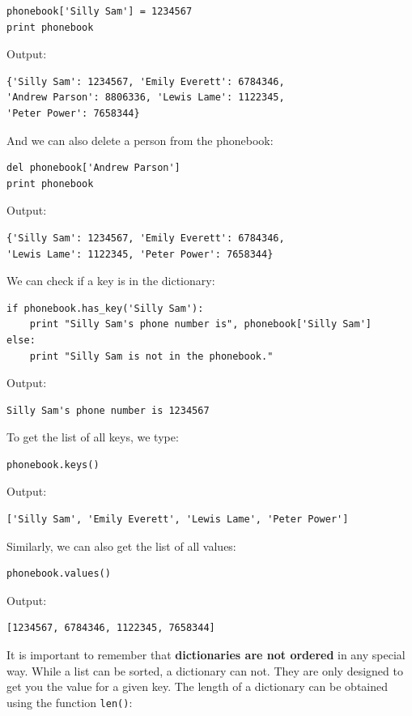 \begin{verbatim}
phonebook['Silly Sam'] = 1234567
print phonebook
\end{verbatim}
Output:

\begin{verbatim}
{'Silly Sam': 1234567, 'Emily Everett': 6784346, 
'Andrew Parson': 8806336, 'Lewis Lame': 1122345, 
'Peter Power': 7658344}
\end{verbatim}
And we can also delete a person from the phonebook:

\begin{verbatim}
del phonebook['Andrew Parson']
print phonebook
\end{verbatim}
Output:

\begin{verbatim}
{'Silly Sam': 1234567, 'Emily Everett': 6784346, 
'Lewis Lame': 1122345, 'Peter Power': 7658344}
\end{verbatim}
We can check if a key is in the dictionary:

\begin{verbatim}
if phonebook.has_key('Silly Sam'):
    print "Silly Sam's phone number is", phonebook['Silly Sam']
else:
    print "Silly Sam is not in the phonebook."
\end{verbatim}
Output:

\begin{verbatim}
Silly Sam's phone number is 1234567
\end{verbatim}
To get the list of all keys, we type:

\begin{verbatim}
phonebook.keys()
\end{verbatim}
Output:

\begin{verbatim}
['Silly Sam', 'Emily Everett', 'Lewis Lame', 'Peter Power']
\end{verbatim}
Similarly, we can also get the list of all values:

\begin{verbatim}
phonebook.values()
\end{verbatim}
Output:

\begin{verbatim}
[1234567, 6784346, 1122345, 7658344]
\end{verbatim}
It is important to remember that {\bf dictionaries are not ordered} in any 
special way. While a list can be sorted, a dictionary can not. They are only 
designed to get you the value for a given key. 
The length of a dictionary can be obtained using the function {\tt len()}:

